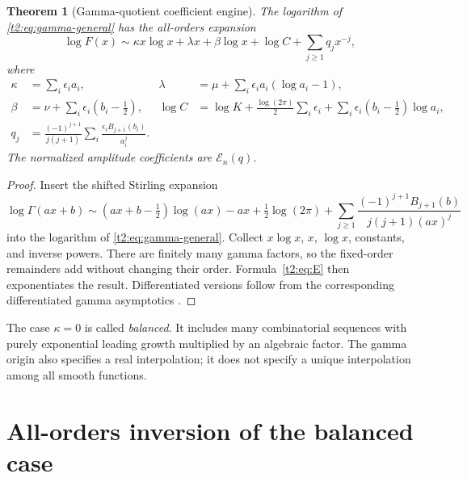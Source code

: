 \documentclass[11pt,openany]{book}
\numberwithin{equation}{chapter}
\theoremstyle{plain}
\newtheorem{theorem}{Theorem}[chapter]
\theoremstyle{definition}
\theoremstyle{remark}
\newcommand{\cE}{\mathcal E}\newcommand{\cL}{\mathcal L}
\begin{document}
\begin{theorem}[Gamma-quotient coefficient engine]
\label{t2:thm:gamma}
The logarithm of \eqref{t2:eq:gamma-general} has the all-orders expansion
\begin{equation}
 \log F(x)\sim\kappa x\log x+\lambda x+\beta\log x+\log C
                      +\sum_{j\ge1}q_jx^{-j},
 \label{t2:eq:gamma-log}
\end{equation}
where
\begin{align}
 \kappa&=\sum_i\epsilon_i a_i,
 &\lambda&=\mu+\sum_i\epsilon_i a_i(\log a_i-1),\nonumber\\
 \beta&=\nu+\sum_i\epsilon_i(b_i-\tfrac12),
 &\log C&=\log K+\frac{\log(2\pi)}2\sum_i\epsilon_i
           +\sum_i\epsilon_i(b_i-\tfrac12)\log a_i,
 \label{t2:eq:gamma-constants}\\
 q_j&=\frac{(-1)^{j+1}}{j(j+1)}
       \sum_i\frac{\epsilon_iB_{j+1}(b_i)}{a_i^j}.
 \label{t2:eq:gamma-q}
\end{align}
The normalized amplitude coefficients are $\cE_n(q)$.
\end{theorem}
\begin{proof}
Insert the shifted Stirling expansion
\[
 \log\Gamma(ax+b)
 \sim (ax+b-\tfrac12)\log(ax)-ax+\tfrac12\log(2\pi)
 +\sum_{j\ge1}\frac{(-1)^{j+1}B_{j+1}(b)}{j(j+1)(ax)^j}
\]
into the logarithm of \eqref{t2:eq:gamma-general}. Collect $x\log x$, $x$, $\log x$, constants, and inverse powers. There are finitely many gamma factors, so the fixed-order remainders add without changing their order. Formula~\eqref{t2:eq:E} then exponentiates the result. Differentiated versions follow from the corresponding differentiated gamma asymptotics \cite{dlmfgamma}.
\end{proof}

The case $\kappa=0$ is called \emph{balanced}. It includes many combinatorial sequences with purely exponential leading growth multiplied by an algebraic factor. The gamma origin also specifies a real interpolation; it does not specify a unique interpolation among all smooth functions.

\section{All-orders inversion of the balanced case}
\label{ct:sec:balanced}
\end{document}
